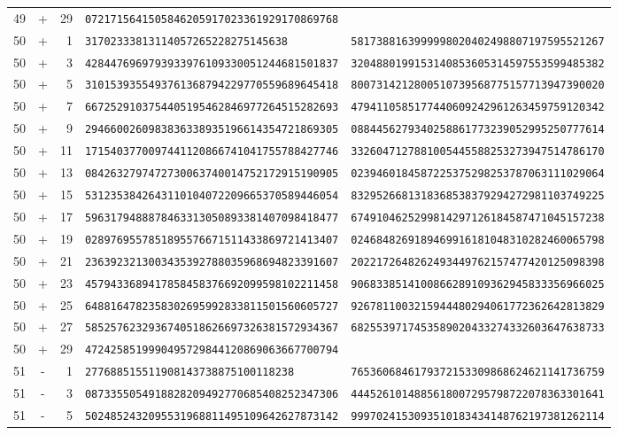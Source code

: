 \begin{longtable}{@{}rcrll@{}}
49&+&29&\texttt{0721715641505846205917023361929170869768}&\texttt{}\\
50&+&1&\texttt{31702333813114057265228275145638}&\texttt{5817388163999998020402498807197595521267}\\
50&+&3&\texttt{4284476969793933976109330051244681501837}&\texttt{3204880199153140853605314597553599485382}\\
50&+&5&\texttt{3101539355493761368794229770559689645418}&\texttt{8007314212800510739568775157713947390020}\\
50&+&7&\texttt{6672529103754405195462846977264515282693}&\texttt{4794110585177440609242961263459759120342}\\
50&+&9&\texttt{2946600260983836338935196614354721869305}&\texttt{0884456279340258861773239052995250777614}\\
50&+&11&\texttt{1715403770097441120866741041755788427746}&\texttt{3326047127881005445588253273947514786170}\\
50&+&13&\texttt{0842632797472730063740014752172915190905}&\texttt{0239460184587225375298253787063111029064}\\
50&+&15&\texttt{5312353842643110104072209665370589446054}&\texttt{8329526681318368538379294272981103749225}\\
50&+&17&\texttt{5963179488878463313050893381407098418477}&\texttt{6749104625299814297126184587471045157238}\\
50&+&19&\texttt{0289769557851895576671511433869721413407}&\texttt{0246848269189469916181048310282460065798}\\
50&+&21&\texttt{2363923213003435392788035968694823391607}&\texttt{2022172648262493449762157477420125098398}\\
50&+&23&\texttt{4579433689417858458376692099598102211458}&\texttt{9068338514100866289109362945833356966025}\\
50&+&25&\texttt{6488164782358302695992833811501560605727}&\texttt{9267811003215944480294061772362642813829}\\
50&+&27&\texttt{5852576232936740518626697326381572934367}&\texttt{6825539717453589020433274332603647638733}\\
50&+&29&\texttt{4724258519990495729844120869063667700794}&\texttt{}\\
51&-&1&\texttt{277688515511908143738875100118238}&\texttt{7653606846179372153309868624621141736759}\\
51&-&3&\texttt{0873355054918828209492770685408252347306}&\texttt{4445261014885618007295798722078363301641}\\
51&-&5&\texttt{5024852432095531968811495109642627873142}&\texttt{9997024153093510183434148762197381262114}\\

\end{longtable}
